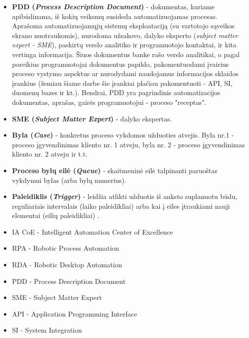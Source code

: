 \documentclass{VUMIFPSBakPrakAt}
\begin{document}
\begin{itemize}
    \item \textbf{PDD (\textit{Process Description Document})} - dokumentas, kuriame apibūdinama, iš kokių veiksmų susideda automatizuojamas procesas. Aprašoma automatizuojamųjų sistemų eksploataciją (su vartotojo sąveikos ekrano nuotraukomis), nurodoma užsakovo, dalyko eksperto (\textit{subject matter expert - SME}), paskirtų verslo analitiko ir programuotojo kontaktai, ir kita vertinga informacija. Šiuos dokumentus banke rašo verslo analitikai, o pagal poreikius programuotojai dokumentus papildo, pakomentuodami įvairius proceso vystymo aspektus ar nurodydami naudojamus informacijos sklaidos įrankius (žemiau šiame darbe šie įrankiai plačiau pakomentuoti - API, SI, duomenų bazes ir kt.). Bendrai, PDD yra pagrindinis automatizacijos dokumentas, aprašas, gairės programuotojui - proceso "receptas".
    \item \textbf{SME (\textit{Subject Matter Expert})} - dalyko ekspertas.
    \item \textbf{Byla (\textit{Case})} - konkretus proceso vykdomos užduoties atvejis. Byla nr.1 - proceso įgyvendinimas kliento nr. 1 atveju, byla nr. 2 - proceso įgyvendinimas kliento nr. 2 atveju ir t.t.
    \item \textbf{Proceso bylų eilė (\textit{Queue})} - skaitmeninė eilė talpinanti paruoštas vykdymui bylas (arba bylų numerius).
    \item \textbf{Paleidiklis (\textit{Trigger})} - leidžia atlikti užduotis iš anksto suplanuotu būdu, reguliariais intervalais (laiko paleidikliai) arba kai į eiles įtraukiami nauji elementai (eilių paleidikliai) \cite{triggers}.
\end{itemize}

\begin{itemize}
    \item IA CoE - Intelligent Automation Center of Excellence
    \item RPA - Robotic Process Automation
    \item RDA - Robotic Desktop Automation
    \item PDD - Process Description Document
    \item SME - Subject Matter Expert
    \item API - Application Programming Interface
    \item SI - System Integration
\end{itemize}
\end{document}
